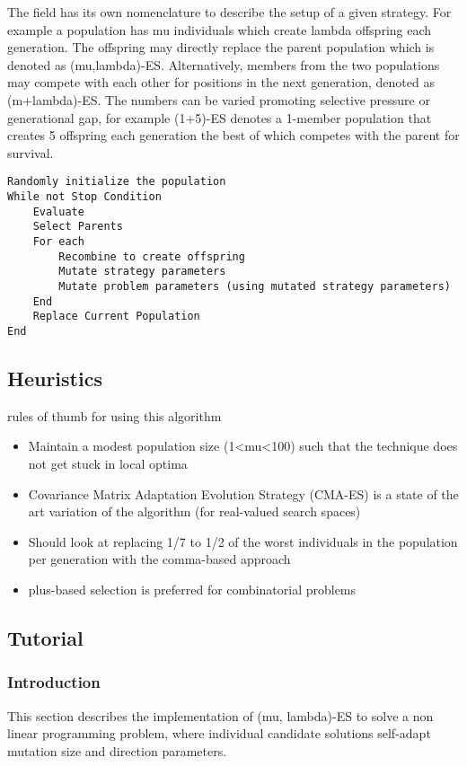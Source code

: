 The field has its own nomenclature to describe the setup of a given strategy. For example a population has mu individuals which create lambda offspring each generation. The offspring may directly replace the parent population which is denoted as (mu,lambda)-ES. Alternatively, members from the two populations may compete with each other for positions in the next generation, denoted as (m+lambda)-ES. The numbers can be varied promoting selective pressure or generational gap, for example (1+5)-ES denotes a 1-member population that creates 5 offspring each generation the best of which competes with the parent for survival.

\begin{lstlisting}
Randomly initialize the population
While not Stop Condition
	Evaluate
	Select Parents
	For each 
		Recombine to create offspring
		Mutate strategy parameters
		Mutate problem parameters (using mutated strategy parameters)
	End
	Replace Current Population
End
\end{lstlisting}

\subsection{Heuristics}
rules of thumb for using this algorithm

\begin{itemize}
	\item Maintain a modest population size (1<mu<100) such that the technique does not get stuck in local optima
	\item Covariance Matrix Adaptation Evolution Strategy (CMA-ES) is a state of the art variation of the algorithm (for real-valued search spaces)
	\item Should look at replacing 1/7 to 1/2 of the worst individuals in the population per generation with the comma-based approach
	\item plus-based selection is preferred for combinatorial problems
\end{itemize}

\subsection{Tutorial}

\subsubsection{Introduction}
This section describes the implementation of (mu, lambda)-ES to solve a non linear programming problem, where individual candidate solutions self-adapt mutation size and direction parameters. 

